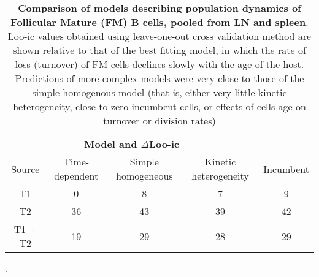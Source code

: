 \documentclass[11pt]{article}
\newcommand{\khi}{Ki67$^\text{hi}$}
\newcommand{\klo}{Ki67$^\text{lo}$}
\begin{document}
	
	\begin{table}[h!]
		\begin{center}
			\renewcommand{\arraystretch}{1.25}
			\begin{tabular}{c c c c c} 
				\toprule 
				\multicolumn{4}{c}{\textbf{Model and $\Delta$Loo-ic}} \\
				\cline{2-5}
				 Source &{\small Time-dependent}  & {\small Simple homogeneous} &  {\small Kinetic heterogeneity} & {\small Incumbent} \\ 
				\toprule
				    T1    &   0             &              8             &                7              &          9         \\ 
				    T2    &   36            &              43            &                39             &          42        \\ 
			      T1 + T2 &   19            &              29            &                28             &          29        \\ 
				\hline
				\toprule 
			\end{tabular}
		\end{center}
		\caption{\small \textbf{Comparison of models describing population dynamics of Follicular Mature (FM) B cells, pooled from LN and spleen}. Loo-ic values obtained using leave-one-out cross validation method are shown relative to that of the best fitting model, in which the rate of loss  (turnover) of FM cells declines slowly with the age of the host. Predictions of more complex models were very close to those of the simple homogenous model (that is, either very little kinetic heterogeneity, close to zero incumbent cells, or effects of cells age on turnover or division rates)}. 
		\label{tab:FM-AICs}
	\end{table} 
	
\end{document}
